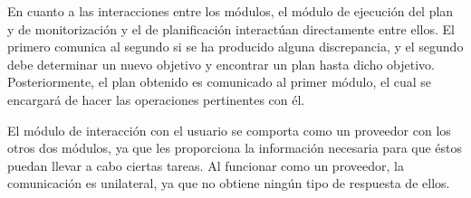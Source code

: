En cuanto a las interacciones entre los módulos, el módulo de ejecución del plan y de
monitorización y el de planificación interactúan directamente entre ellos. El primero
comunica al segundo si se ha producido alguna discrepancia, y el segundo debe determinar
un nuevo objetivo y encontrar un plan hasta dicho objetivo. Posteriormente, el plan obtenido
es comunicado al primer módulo, el cual se encargará de hacer las operaciones pertinentes
con él.

El módulo de interacción con el usuario se comporta como un proveedor con los otros dos
módulos, ya que les proporciona la información necesaria para que éstos puedan
llevar a cabo ciertas tareas. Al funcionar como un proveedor, la comunicación es unilateral,
ya que no obtiene ningún tipo de respuesta de ellos.

